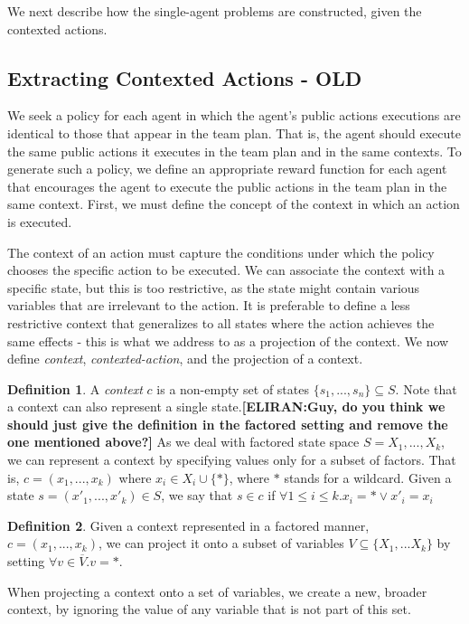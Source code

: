 \documentclass[letterpaper]{article} %
\theoremstyle{definition}
\newtheorem{definition}{Definition}
\newcommand{\eliran}[1]{\textbf{[\color{red}ELIRAN:#1]}}
\begin{document}
We next describe how the single-agent problems are constructed, given the contexted actions.


\subsection{Extracting Contexted Actions - OLD}

We seek a policy for each agent in which the agent's public actions executions are identical to those that appear in the team plan. That is, the agent should execute the same public actions it executes in the team plan and in the same contexts.
To generate such a policy, we define an appropriate reward function for each agent that encourages the agent to execute the public actions in the team plan in the same context.
First, we must define the concept of the context in which an action is executed.

The context of an action must capture the conditions under which the policy chooses the specific action to be executed. We can associate the context with a specific state, but this is too restrictive, as the state might contain various variables that are irrelevant to the action. It is preferable to define a less restrictive context that generalizes to all states where the action achieves the same effects - this is what we address to as a projection of the context. We now define {\em context}, {\em contexted-action}, and the projection of a context.
\begin{definition}
A {\em context} $c$ is a non-empty set of states $\{s_1,..., s_n\}\subseteq S$. Note that a context can also represent a single state.\eliran{Guy, do you think we should just give the definition in the factored setting and remove the one mentioned above?}
As we deal with factored state space $S=X_1,...,X_k$, we can represent a context by specifying values only for a subset of factors. That is, $c=(x_1,..., x_k)$ where $x_i\in X_i \cup \{*\}$, where $*$ stands for a wildcard.
Given a state $s=(x'_1,...,x'_k)\in S$, we say that $s\in c$ if $\forall 1\leq i\leq k. x_i=* \vee x'_i=x_i$
\end{definition}

\begin{definition}
Given a context represented in a factored manner, $c=(x_1,..., x_k)$, we can project it onto a subset of variables $V \subseteq \{X_1,...X_k\}$ by setting $\forall v\in \overline{V}. v=*$.
\end{definition}
When projecting a context onto a set of variables, we create a new, broader context, by ignoring the value of any variable that is not part of this set.
\end{document}
